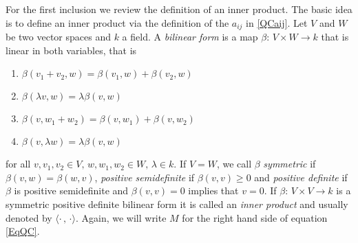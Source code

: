 For the first inclusion we review the definition of an inner product. The basic idea is to define an inner product via the  definition of the $ a_{ij} $ in \ref{QCaij}.
Let $ V $ and $ W $ be two vector spaces and $ k  $ a field. A {\itshape bilinear form} is a map $ \beta: \, V \times W \to k $ that is linear in both variables, that is 
\begin{enumerate}
	\item $\beta(v_1+v_2,w) = \beta(v_1,w) + \beta(v_2,w)  $
	\item  $\beta(\lambda v,w)= \lambda \beta(v,w) $
	\item $ \beta(v,w_1+w_2) = \beta(v,w_1)+ \beta(v,w_2) $
	\item $ \beta(v,\lambda w) = \lambda\beta(v,w) $
\end{enumerate}
for all $ v,v_1,v_2 \in V, \, w,w_1,w_2 \in W, \, \lambda \in k $. 
If $ V = W $, we call $ \beta $ {\itshape symmetric} if $ \beta(v,w) = \beta(w,v) $, {\itshape positive semidefinite} if 
$ \beta(v,v) \ge 0 $ and {\itshape positive definite} if $ \beta $ is positive semidefinite and $ \beta(v,v)= 0 $ implies that $ v = 0 $. 
If $ \beta: \, V \times V \to k $ is a symmetric positive definite bilinear form it is called an {\itshape inner product} and usually denoted by $ \langle \cdot \, , \, \cdot \rangle $.
Again, we will write $ M $ for the right hand side of equation \ref{EqQC}.
